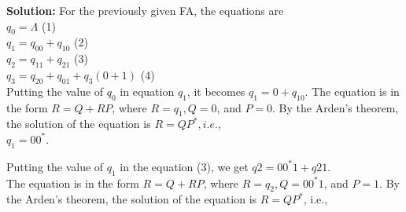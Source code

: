 \documentclass[9pt]{beamer}
\begin{document}
\begin{frame}
\textbf{Solution:} For the previously given FA, the equations are\\

\hspace*{4cm} $q_0 = \Lambda$ \hspace*{5cm} (1)\\
\hspace*{4cm} $q_1 = q_00 + q_10$ \hspace*{4cm}  (2)\\
\hspace*{4cm} $q_2 = q_11 + q_21$ \hspace*{4cm}  (3)\\
\hspace*{4cm} $q_3 = q_20 + q_01 + q_3 (0 + 1)$  \hspace*{2cm}   (4)\\

 \vspace*{0.1cm} 
Putting the value of $q_0$ in equation $q_1$, it becomes $q_1 = 0 + q_10$. The equation is in the form $R = Q +
RP$, where $R = q_1, Q = 0$, and $P = 0$. By the Arden’s theorem, the solution of the equation is $R = QP^*, i.e.$,\\

 \vspace*{0.1cm} 
\hspace*{5cm} $q_1 = 00^*$.\\
 \vspace*{0.1cm} 
 
 \hspace*{0.5cm} Putting the value of $q_1$ in the equation (3), we get $q2 = 00^*1 + q21$.\\
 \hspace*{0.5cm} The equation is in the form $R = Q + RP$, where $R = q_2, Q = 00^*1$, and $P = 1$. By the Arden’s theorem,
the solution of the equation is $R = QP^*$, i.e.,\\

 \vspace*{0.1cm}
\end{frame}
\end{document}
